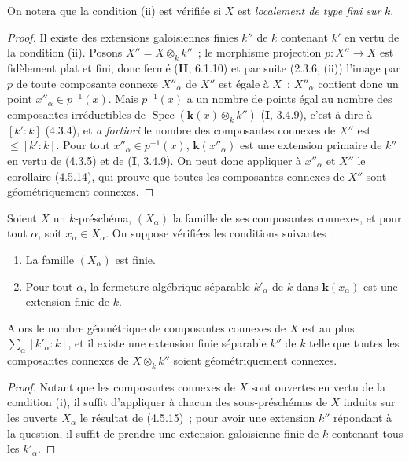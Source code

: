 On notera que la condition (ii) est vérifiée si $X$ est \emph{localement de
type fini sur} $k$.

\begin{proof}
Il existe des extensions galoisiennes finies $k''$ de $k$ contenant $k'$ en
vertu de la condition (ii). Posons $X''=X\otimes_k k''$~; le morphisme
projection $p:X''\to X$ est fidèlement plat et fini, donc fermé (\textbf{II}, 6.1.10) et
par suite (2.3.6, (ii)) l'image par $p$ de toute composante connexe $X''_\alpha$
de $X''$ est égale à $X$~; $X''_\alpha$ contient donc un point
$x''_\alpha\in p^{-1}(x)$. Mais $p^{-1}(x)$ a un nombre de points égal au
nombre des composantes irréductibles de
$\operatorname{Spec}(\boldsymbol{k}(x)\otimes_k k'')$ (\textbf{I}, 3.4.9), c'est-à-dire à $[k':k]$
(4.3.4), et \emph{a fortiori} le nombre des composantes connexes de $X''$ est
$\leqslant[k':k]$. Pour tout $x''_\alpha\in p^{-1}(x)$, $\boldsymbol{k}(x''_\alpha)$ est une
extension primaire de $k''$ en vertu de (4.3.5) et de (\textbf{I}, 3.4.9). On peut donc
appliquer à $x''_\alpha$ et $X''$ le corollaire (4.5.14), qui prouve que toutes
les composantes connexes de $X''$ sont géométriquement connexes.
\end{proof}

\begin{corollary}[4.5.16]
\label{IV.2.4.5.16-fr}
Soient $X$ un $k$-préschéma, $(X_\alpha)$ la famille de ses composantes
connexes, et pour tout $\alpha$, soit $x_\alpha\in X_\alpha$. On suppose
vérifiées les conditions suivantes~:
\begin{enumerate}
\item[\textup{(i)}] La famille $(X_\alpha)$ est finie.
\item[\textup{(ii)}] Pour tout $\alpha$, la fermeture algébrique séparable $k'_\alpha$
de $k$ dans $\boldsymbol{k}(x_\alpha)$ est une extension finie de $k$.
\end{enumerate}
Alors le nombre géométrique de composantes connexes de $X$ est au plus
$\sum_\alpha[k'_\alpha:k]$, et il existe une extension finie séparable $k''$ de
$k$ telle que toutes les composantes connexes de $X\otimes_k k''$ soient
géométriquement connexes.
\end{corollary}

\begin{proof}
Notant que les composantes connexes de $X$ sont ouvertes en vertu de la
condition (i), il suffit d'appliquer à chacun des sous-préschémas de $X$ induits
sur les ouverts $X_\alpha$ le résultat de (4.5.15)~; pour avoir une extension
$k''$ répondant à la question, il suffit de prendre une extension galoisienne
finie de $k$ contenant tous les $k'_\alpha$.
\end{proof}

